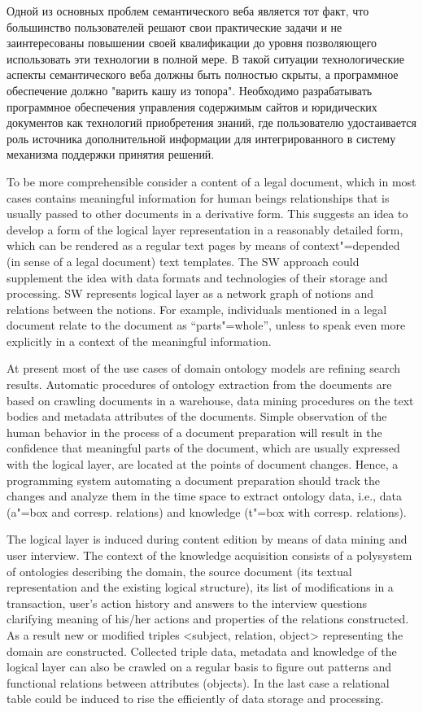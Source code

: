 \documentclass[conference]{IEEEtran}
\begin{document}
{{Одной из основных проблем семантического веба является тот факт, что большинство пользователей решают свои практические задачи и не заинтересованы повышении своей квалификации до уровня позволяющего использовать эти технологии в полной мере. В такой ситуации технологические аспекты семантического веба должны быть полностью скрыты, а программное обеспечение должно "варить кашу из топора". Необходимо разрабатывать программное обеспечения управления содержимым сайтов и юридических документов как технологий приобретения знаний, где пользователю удостаивается роль источника дополнительной информации для интегрированного в систему механизма поддержки принятия решений.



To be more comprehensible consider a content of a legal document, which in most cases contains meaningful information for human beings relationships that is usually passed to other documents in a derivative form. This suggests an idea to develop a form of the logical layer representation in a reasonably detailed form, which can be rendered as a regular text pages by means of context"=depended (in sense of a legal document) text templates. The SW approach could supplement the idea with data formats and technologies of their storage and processing. SW represents logical layer as a network graph of notions and relations between the notions. For example, individuals mentioned in a legal document relate to the document as “parts"=whole”, unless to speak even more explicitly in a context of the meaningful information.

At present most of the use cases of domain ontology models are refining search results. Automatic procedures of ontology extraction from the documents are based on crawling documents in a warehouse, data mining procedures on the text bodies and metadata attributes of the documents. Simple observation of the human behavior in the process of a document preparation will result in the confidence that meaningful parts of the document, which are usually expressed with the logical layer, are located at the points of document changes. Hence, a programming system automating a document preparation should track the changes and analyze them in the time space to extract ontology data, i.e., data (a"=box and corresp. relations) and knowledge (t"=box with corresp. relations).

The logical layer is induced during content edition by means of data mining and user interview. The context of the knowledge acquisition consists of a polysystem of ontologies describing the domain, the source document (its textual representation and the existing logical structure), its list of modifications in a transaction, user's action history and answers to the interview questions clarifying meaning of his/her actions and properties of the relations constructed. As a result new or modified triples <subject, relation, object> representing the domain are constructed. Collected triple data, metadata and knowledge of the logical layer can also be crawled on a regular basis to figure out patterns and functional relations between attributes (objects). In the last case a relational table could be induced to rise the efficiently of data storage and processing.

}}
\end{document}
